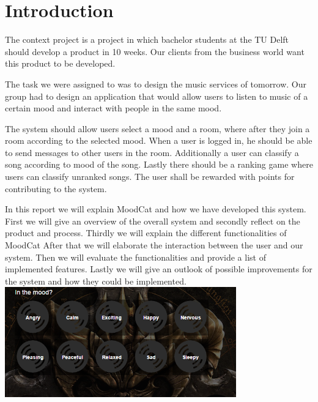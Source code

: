 \chapter{Introduction}

The context project is a project in which bachelor students at the TU Delft should develop a product in 10 weeks.
Our clients from the business world want this product to be developed.

The task we were assigned to was to design the music services of tomorrow.
Our group had to design an application that would allow users to listen to music of a certain mood and interact with people in the same mood.


The system should allow users select a mood and a room, where after they join a room according to the selected mood.
When a user is logged in, he should be able to send messages to other users in the room.
Additionally a user can classify a song according to mood of the song.
Lastly there should be a ranking game where users can classify unranked songs.
The user shall be rewarded with points for contributing to the system.


In this report we will explain MoodCat and how we have developed this system.
First we will give an overview of the overall system and secondly reflect on the product and process.
Thirdly we will explain the different functionalities of MoodCat After that we will elaborate the interaction between the user and our system.
Then we will evaluate the functionalities and provide a list of implemented features.
Lastly we will give an outlook of possible improvements for the system and how they could be implemented.\\

\includegraphics[width= 0.75\textwidth]{moodselection.png}